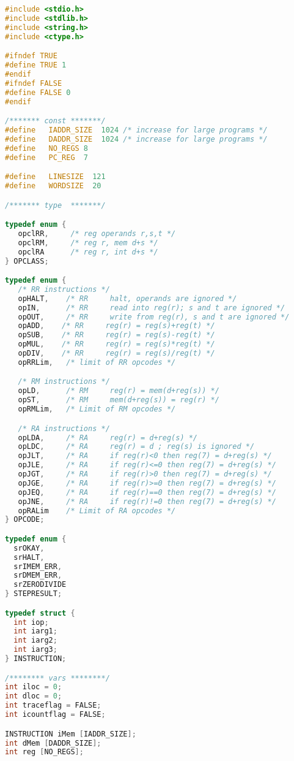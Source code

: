 \documentclass[lang=cn,10pt]{elegantbook}
\begin{document}
\begin{lstlisting}[caption={tm.c},language=c]
#include <stdio.h>
#include <stdlib.h>
#include <string.h>
#include <ctype.h>

#ifndef TRUE
#define TRUE 1
#endif
#ifndef FALSE
#define FALSE 0
#endif

/******* const *******/
#define   IADDR_SIZE  1024 /* increase for large programs */
#define   DADDR_SIZE  1024 /* increase for large programs */
#define   NO_REGS 8
#define   PC_REG  7

#define   LINESIZE  121
#define   WORDSIZE  20

/******* type  *******/

typedef enum {
   opclRR,     /* reg operands r,s,t */
   opclRM,     /* reg r, mem d+s */
   opclRA      /* reg r, int d+s */
} OPCLASS;

typedef enum {
   /* RR instructions */
   opHALT,    /* RR     halt, operands are ignored */
   opIN,      /* RR     read into reg(r); s and t are ignored */
   opOUT,     /* RR     write from reg(r), s and t are ignored */
   opADD,    /* RR     reg(r) = reg(s)+reg(t) */
   opSUB,    /* RR     reg(r) = reg(s)-reg(t) */
   opMUL,    /* RR     reg(r) = reg(s)*reg(t) */
   opDIV,    /* RR     reg(r) = reg(s)/reg(t) */
   opRRLim,   /* limit of RR opcodes */

   /* RM instructions */
   opLD,      /* RM     reg(r) = mem(d+reg(s)) */
   opST,      /* RM     mem(d+reg(s)) = reg(r) */
   opRMLim,   /* Limit of RM opcodes */

   /* RA instructions */
   opLDA,     /* RA     reg(r) = d+reg(s) */
   opLDC,     /* RA     reg(r) = d ; reg(s) is ignored */
   opJLT,     /* RA     if reg(r)<0 then reg(7) = d+reg(s) */
   opJLE,     /* RA     if reg(r)<=0 then reg(7) = d+reg(s) */
   opJGT,     /* RA     if reg(r)>0 then reg(7) = d+reg(s) */
   opJGE,     /* RA     if reg(r)>=0 then reg(7) = d+reg(s) */
   opJEQ,     /* RA     if reg(r)==0 then reg(7) = d+reg(s) */
   opJNE,     /* RA     if reg(r)!=0 then reg(7) = d+reg(s) */
   opRALim    /* Limit of RA opcodes */
} OPCODE;

typedef enum {
  srOKAY,
  srHALT,
  srIMEM_ERR,
  srDMEM_ERR,
  srZERODIVIDE
} STEPRESULT;

typedef struct {
  int iop;
  int iarg1;
  int iarg2;
  int iarg3;
} INSTRUCTION;

/******** vars ********/
int iloc = 0;
int dloc = 0;
int traceflag = FALSE;
int icountflag = FALSE;

INSTRUCTION iMem [IADDR_SIZE];
int dMem [DADDR_SIZE];
int reg [NO_REGS];


\end{lstlisting}
\end{document}
